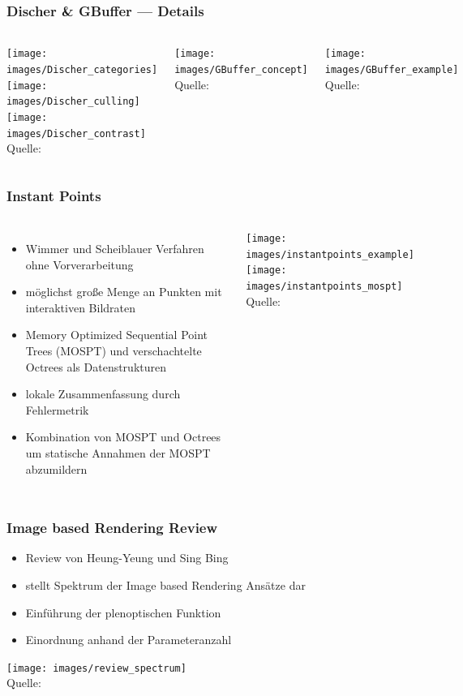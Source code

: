 \documentclass[aspectratio=169]{beamer}
\begin{document}
\begin{frame}
    \frametitle{Discher \& GBuffer --- Details}
    \begin{columns}
        \texttt{[image: images/Discher\_categories]}
        \texttt{[image: images/Discher\_culling]}
        \texttt{[image: images/Discher\_contrast]}
        \centering
        \\[-1ex]{\tiny Quelle:~\cite{discher2018point}}

        \texttt{[image: images/GBuffer\_concept]}
        \centering
        \\[-1ex]{\tiny Quelle:~\cite{saito1990comprehensible}}

        \texttt{[image: images/GBuffer\_example]}
        \centering
        \\[-1ex]{\tiny Quelle:~\cite{saito1990comprehensible}}
    \end{columns}
\end{frame}

\begin{frame}
    \frametitle{Instant Points}
    \begin{columns}
        \begin{itemize}
            \item Wimmer und Scheiblauer Verfahren ohne Vorverarbeitung
            \item möglichst große Menge an Punkten mit interaktiven Bildraten
            \item Memory Optimized
            Sequential Point Trees (MOSPT) und verschachtelte Octrees als Datenstrukturen
            \item lokale Zusammenfassung durch Fehlermetrik
            \item Kombination von MOSPT und Octrees um statische Annahmen der MOSPT abzumildern
        \end{itemize}

    \texttt{[image: images/instantpoints\_example]}
    \centering
    \texttt{[image: images/instantpoints\_mospt]}
    \centering
    \\[-1ex]{\tiny Quelle:~\cite{wimmer2006instant}}
    \end{columns}
\end{frame}

\begin{frame}
    \frametitle{Image based Rendering Review}
    \begin{itemize}
        \item Review von Heung-Yeung und Sing Bing
        \item stellt Spektrum der Image based Rendering Ansätze dar
        \item Einführung der plenoptischen Funktion
        \item Einordnung anhand der Parameteranzahl
    \end{itemize}
    \texttt{[image: images/review\_spectrum]}
    \centering
    \\[-1ex]{\tiny Quelle:~\cite{shum2000review}}
\end{frame}
\end{document}
